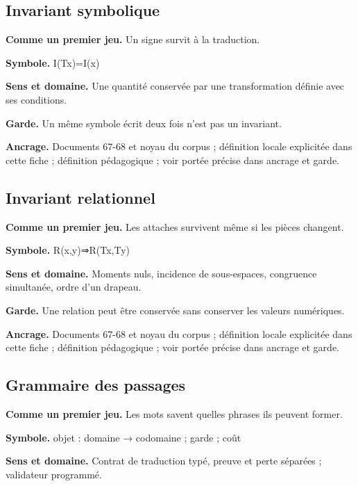 \documentclass[
  9pt,
  a4paper,
]{article}
\begin{document}
\hypertarget{invariant-symbolique}{%
\subsection{Invariant symbolique}\label{invariant-symbolique}}

\textbf{Comme un premier jeu.} Un signe survit à la traduction.

\textbf{Symbole.} I(Tx)=I(x)

\textbf{Sens et domaine.} Une quantité conservée par une transformation
définie avec ses conditions.

\textbf{Garde.} Un même symbole écrit deux fois n'est pas un invariant.

\textbf{Ancrage.} Documents 67-68 et noyau du corpus ; définition locale
explicitée dans cette fiche ; définition pédagogique ; voir portée
précise dans ancrage et garde.

\hypertarget{invariant-relationnel}{%
\subsection{Invariant relationnel}\label{invariant-relationnel}}

\textbf{Comme un premier jeu.} Les attaches survivent même si les pièces
changent.

\textbf{Symbole.} R(x,y)⇒R(Tx,Ty)

\textbf{Sens et domaine.} Moments nuls, incidence de sous-espaces,
congruence simultanée, ordre d'un drapeau.

\textbf{Garde.} Une relation peut être conservée sans conserver les
valeurs numériques.

\textbf{Ancrage.} Documents 67-68 et noyau du corpus ; définition locale
explicitée dans cette fiche ; définition pédagogique ; voir portée
précise dans ancrage et garde.

\hypertarget{grammaire-des-passages}{%
\subsection{Grammaire des passages}\label{grammaire-des-passages}}

\textbf{Comme un premier jeu.} Les mots savent quelles phrases ils
peuvent former.

\textbf{Symbole.} objet : domaine → codomaine ; garde ; coût

\textbf{Sens et domaine.} Contrat de traduction typé, preuve et perte
séparées ; validateur programmé.
\end{document}
